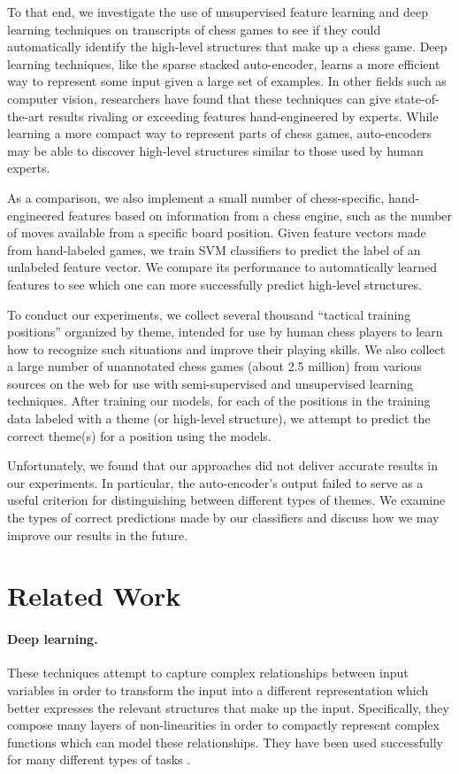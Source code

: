 \documentclass[11pt]{article}
\begin{document}
To that end, we investigate the use of unsupervised feature learning and deep learning techniques on transcripts of chess games to see if they could automatically identify the high-level structures that make up a chess game. Deep learning techniques, like the sparse stacked auto-encoder, learns a more efficient way to represent some input given a large set of examples. In other fields such as computer vision, researchers have found that these techniques can give state-of-the-art results rivaling or exceeding features hand-engineered by experts. While learning a more compact way to represent parts of chess games, auto-encoders may be able to discover high-level structures similar to those used by human experts.

As a comparison, we also implement a small number of chess-specific, hand-engineered features based on information from a chess engine, such as the number of moves available from a specific board position. Given feature vectors made from hand-labeled games, we train SVM classifiers to predict the label of an unlabeled feature vector. We compare its performance to automatically learned features to see which one can more successfully predict high-level structures.

To conduct our experiments, we collect several thousand ``tactical training positions'' organized by theme, intended for use by human chess players to learn how to recognize such situations and improve their playing skills. We also collect a large number of unannotated chess games (about 2.5 million) from various sources on the web for use with semi-supervised and unsupervised learning techniques. After training our models, for each of the positions in the training data labeled with a theme (or high-level structure), we attempt to predict the correct theme(s) for a position using the models.

Unfortunately, we found that our approaches did not deliver accurate results in our experiments. In particular, the auto-encoder's output failed to serve as a useful criterion for distinguishing between different types of themes. We examine the types of correct predictions made by our classifiers and discuss how we may improve our results in the future.

\section{Related Work}

\paragraph{Deep learning.} These techniques attempt to capture complex relationships between input variables in order to transform the input into a different representation which better expresses the relevant structures that make up the input. Specifically, they compose many layers of non-linearities in order to compactly represent complex functions which can model these relationships. They have been used successfully for many different types of tasks \cite{ng-mnist,ng-vision,ng-nlp}.
\end{document}
